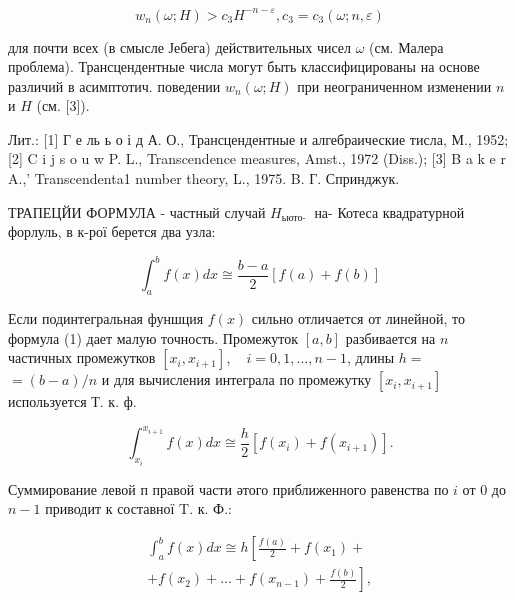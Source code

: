 \documentclass[10pt]{article}
\begin{document}
\[

w_{n}(\omega ; H)>c_{3} H^{-n-\varepsilon}, c_{3}=c_{3}(\omega ; n, \varepsilon)

\]



для почти всех (в смысле Јебега) действительных чисел $\omega$ (см. Малера проблема). Трансцендентные числа могут быть классифицированы на основе различий в асимптотич. поведении $w_{n}(\omega ; H)$ при неограниченном изменении $n$ и $H$ (см. [3]).



Лит.: [1] Г е ль ь о і д А. О., Трансцендентные и алгебраические тисла, М., 1952; [2] C i j s o u w P. L., Transcendence measures, Amst., 1972 (Diss.); [3] B a k e r A.,' Transcendenta1 number theory, L., 1975. B. Г. Спринджук.



ТРАПЕЦЙИ ФОРМУЛА - частный случай $H_{\text {ьюто- }}$ на- Котеса квадратурной форлуль, в к-рої берется два узла:



\[

\int_{a}^{b} f(x) d x \cong \frac{b-a}{2}[f(a)+f(b)]

\]



Если подинтегральная фуншция $f(x)$ сильно отличается от линейной, то формула (1) дает малую точность. Промежуток $[a, b]$ разбивается на $n$ частичных промежутков $\left[x_{i}, x_{i+1}\right], \quad i=0,1, \ldots, n-1$, длины $h=$ $=(b-a) / n$ и для вычисления интеграла по промежутку $\left[x_{i}, x_{i+1}\right]$ используется Т. к. ф.



\[

\int_{x_{i}}^{x_{i+1}} f(x) d x \cong \frac{h}{2}\left[f\left(x_{i}\right)+f\left(x_{i+1}\right)\right] .

\]



Суммирование левой п правой части әтого приближенного равенства по $i$ от 0 до $n-1$ приводит к составної T. к. Ф.:



\[

\begin{gathered}

\int_{a}^{b} f(x) d x \cong h\left[\frac{f(a)}{2}+f\left(x_{1}\right)+\right. \\

\left.+f\left(x_{2}\right)+\ldots+f\left(x_{n-1}\right)+\frac{f(b)}{2}\right],

\end{gathered}

\]
\end{document}
